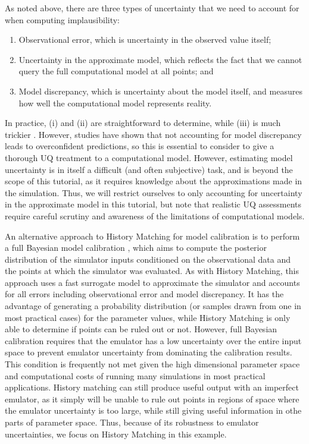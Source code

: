 \documentclass[openacc]{rstransa}%
\begin{document}
As noted above, there are three types of uncertainty that we need to account for when computing implausibility:

\begin{enumerate}
\item Observational error, which is uncertainty in the observed value itself;
\item Uncertainty in the approximate model, which reflects the fact that we cannot query the full computational model at all points; and
\item Model discrepancy, which is uncertainty about the model itself, and measures how well the computational model represents reality.
\end{enumerate}

In practice, (i) and (ii) are straightforward to determine, while (iii) is much trickier \cite{modeldiscrep}. However, studies have shown that not accounting for model discrepancy leads to overconfident predictions, so this is essential to consider to give a thorough UQ treatment to a computational model. However, estimating model uncertainty is in itself a difficult (and often subjective) task, and is beyond the scope of this tutorial, as it requires knowledge about the approximations made in the simulation. Thus, we will restrict ourselves to only accounting for uncertainty in the approximate model in this tutorial, but note that realistic UQ assessments require careful scrutiny and awareness of the limitations of computational models.

An alternative approach to History Matching for model calibration is to
perform a full Bayesian model calibration \cite{calibration},
which aims to compute the posterior
distribution of the simulator inputs conditioned on the observational data
and the points at which the simulator was evaluated.
As with History Matching, this approach uses a fast surrogate model to
approximate the simulator and accounts for all errors including observational
error and model discrepancy. It has the advantage of generating a probability
distribution (or samples drawn from one in most practical cases) for the
parameter values, while History Matching is only able to determine if
points can be ruled out or not.
However, full Bayesian calibration requires that
the emulator has a low uncertainty over the entire input space to prevent
emulator uncertainty from dominating the calibration
results. This condition is frequently not met given the high dimensional
parameter space and computational costs of running many simulations in
most practical applications.
History matching can still produce useful output with an imperfect
emulator, as it simply will be unable to rule out points in regions of
space where the emulator uncertainty is too large, while still giving
useful information in othe parts of parameter space. Thus, because of
its robustness to emulator uncertainties, we focus on History Matching
in this example.
\end{document}
